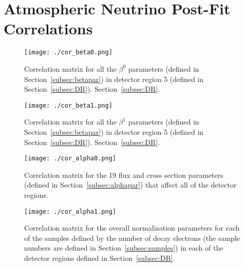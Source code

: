 

\section{Atmospheric Neutrino Post-Fit Correlations}
\label{sec:postfit}




\begin{figure}[h]
  \begin{center}
    \texttt{[image: ./cor\_beta0.png]}
  \end{center}
  \caption{Correlation matrix for all the $\beta^{0}$ parameters (defined in 
  Section~\ref{subsec:betapar}) in detector region 5 (defined in Section~\ref{subsec:DR}).
  Section~\ref{subsec:DR}.}
  \label{fig:fitbeta0corr}
\end{figure}


\begin{figure}[h]
  \begin{center}
    \texttt{[image: ./cor\_beta1.png]}
  \end{center}
  \caption{Correlation matrix for all the $\beta^{1}$ parameters (defined in 
  Section~\ref{subsec:betapar}) in detector region 5 (defined in Section~\ref{subsec:DR}).
  Section~\ref{subsec:DR}.}
  \label{fig:fitbeta1corr}
\end{figure}



\begin{figure}[h]
  \begin{center}
    \texttt{[image: ./cor\_alpha0.png]}
  \end{center}
  \caption{Correlation matrix for the 19 flux and cross section parameters (defined in 
  Section~\ref{subsec:alphapar}) that affect all of the detector regions.}
  \label{fig:fitalpha0corr}
\end{figure}


\begin{figure}[h]
  \begin{center}
    \texttt{[image: ./cor\_alpha1.png]}
  \end{center}
  \caption{Correlation matrix for the overall normalization parameters for each
  of the samples defined by the number of decay electrons (the sample numbers
  are defined in Section~\ref{subsec:samples}) in each of the detector regions
  defined in Section~\ref{subsec:DR}.}
  \label{fig:fitalpha1corr}
\end{figure}




